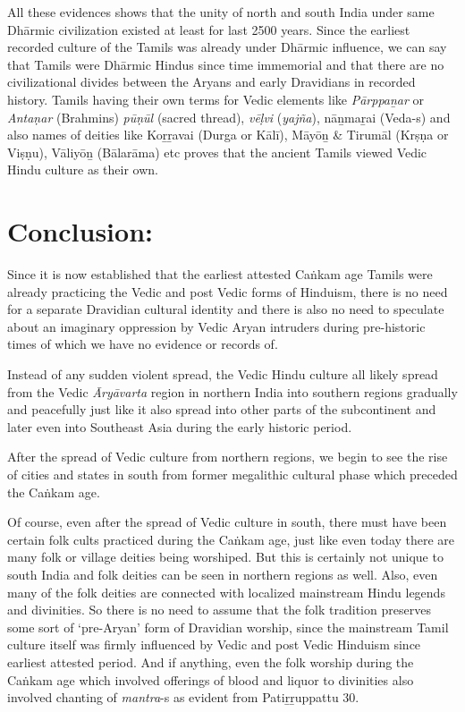 All these evidences shows that the unity of north and south India under same Dhārmic civilization existed at least for last 2500 years. Since the earliest recorded culture of the Tamils was already under Dhārmic influence, we can say that Tamils were Dhārmic Hindus since time immemorial and that there are no civilizational divides between the Aryans and early Dravidians in recorded history. Tamils having their own terms for Vedic elements like \textit{Pārppaṉar} or \textit{Antaṇar} (Brahmins) \textit{pūṇūl} (sacred thread), \textit{vēḷvi} (\textit{yajña}), nāṉmaṟai (Veda-s) and also names of deities like Koṟṟavai (Durga or Kālī), Māyōṉ \& Tirumāl (Krṣṇa or Viṣṇu), Vāliyōṉ (Bālarāma) etc proves that the ancient Tamils viewed Vedic Hindu culture as their own.


\section*{Conclusion:}

Since it is now established that the earliest attested Caṅkam age Tamils were already practicing the Vedic and post Vedic forms of Hinduism, there is no need for a separate Dravidian cultural identity and there is also no need to speculate about an imaginary oppression by Vedic Aryan intruders during pre-historic times of which we have no evidence or records of.

Instead of any sudden violent spread, the Vedic Hindu culture all likely spread from the Vedic \textit{Āryāvarta} region in northern India into southern regions gradually and peacefully just like it also spread into other parts of the subcontinent and later even into Southeast Asia during the early historic period.

After the spread of Vedic culture from northern regions, we begin to see the rise of cities and states in south from former megalithic cultural phase which preceded the Caṅkam age.

Of course, even after the spread of Vedic culture in south, there must have been certain folk cults practiced during the Caṅkam age, just like even today there are many folk or village deities being worshiped. But this is certainly not unique to south India and folk deities can be seen in northern regions as well. Also, even many of the folk deities are connected with localized mainstream Hindu legends and divinities. So there is no need to assume that the folk tradition preserves some sort of ‘pre-Aryan’ form of Dravidian worship, since the mainstream Tamil culture itself was firmly influenced by Vedic and post Vedic Hinduism since earliest attested period. And if anything, even the folk worship during the Caṅkam age which involved offerings of blood and liquor to divinities also involved chanting of \textit{mantra}-s as evident from Patiṟṟuppattu 30.

